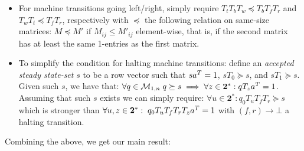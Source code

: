 \begin{itemize}

  \item For machine transitions going left/right, simply require $T_t T_b T_w\preceq T_b T_f T_r$ and $T_w T_t\preceq T_f T_r$, respectively with $\preceq$ the following relation on same-size matrices: $M\preceq M'$ if $M_{ij}\le M'_{ij}$ element-wise, that is, if the second matrix has at least the same 1-entries as the first matrix.

  \item To simplify the condition for halting machine transitions: define an \emph{accepted steady state-set} $s$ to be a row vector such that $sa^T = 1$, $s T_0\succeq s$, and $s T_1\succeq s$. Given such $s$, we have that: $\forall q\in\mathcal{M}_{1,n}\; q \succeq s\implies \forall z\in\mathbf{2}^*: qT_{z}a^T = 1$. Assuming that such $s$ exists we can simply require: $\forall u\in\mathbf{2}^*: q_0T_u T_f T_r \succeq s$ which is stronger than $\forall u,z\in\mathbf{2}^*: \; q_0 T_u T_f T_r T_z a^T = 1$ with $(f,r) \to \bot$ a halting transition.



\end{itemize}

Combining the above, we get our main result:

